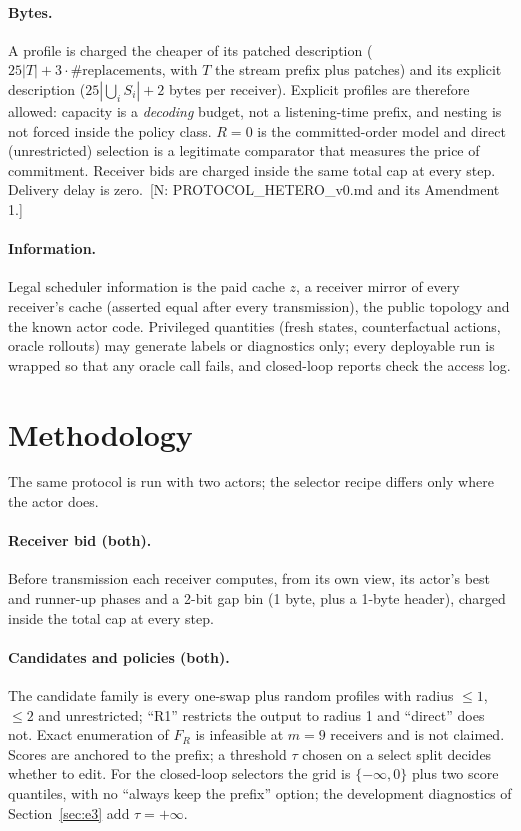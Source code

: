 \documentclass[11pt]{article}
\theoremstyle{definition}
\newif\ifshownotes\shownotestrue
\newcommand{\NOTE}[1]{\ifshownotes{\color{notecol}\,\textsf{\footnotesize[N: #1]}}\fi}
\begin{document}
\paragraph{Bytes.} A profile is charged the cheaper of its patched description
($25|T| + 3\cdot\#\text{replacements}$, with $T$ the stream prefix plus patches) and its explicit
description ($25|\bigcup_i S_i| + 2$ bytes per receiver). Explicit profiles are therefore allowed:
capacity is a \emph{decoding} budget, not a listening-time prefix, and nesting is not forced
inside the policy class. $R=0$ is the committed-order model and direct (unrestricted) selection is
a legitimate comparator that measures the price of commitment. Receiver bids are charged inside
the same total cap at every step. Delivery delay is zero.
\NOTE{PROTOCOL\_HETERO\_v0.md and its Amendment 1.}

\paragraph{Information.} Legal scheduler information is the paid cache $z$, a receiver mirror of
every receiver's cache (asserted equal after every transmission), the public topology and the
known actor code. Privileged quantities (fresh states, counterfactual actions, oracle rollouts)
may generate labels or diagnostics only; every deployable run is wrapped so that any oracle call
fails, and closed-loop reports check the access log.

\section{Methodology}
The same protocol is run with two actors; the selector recipe differs only where the actor does.
\paragraph{Receiver bid (both).} Before transmission each receiver computes, from its own view, its
actor's best and runner-up phases and a 2-bit gap bin (1 byte, plus a 1-byte header), charged inside
the total cap at every step.
\paragraph{Candidates and policies (both).} The candidate family is every one-swap plus random
profiles with radius $\le 1$, $\le 2$ and unrestricted; ``R1'' restricts the output to radius 1 and
``direct'' does not. Exact enumeration of $F_R$ is infeasible at $m=9$ receivers and is not claimed.
Scores are anchored to the prefix; a threshold $\tau$ chosen on a select split decides whether to
edit. For the closed-loop selectors the grid is $\{-\infty, 0\}$ plus two score quantiles, with no
``always keep the prefix'' option; the development diagnostics of Section~\ref{sec:e3} add
$\tau=+\infty$.
\end{document}

